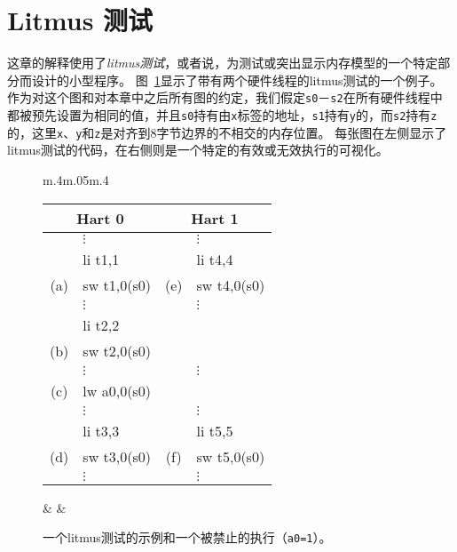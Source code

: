 \section{Litmus 测试}\label{sec:litmustests}
这章的解释使用了{\em litmus测试}，或者说，为测试或突出显示内存模型的一个特定部分而设计的小型程序。
图~\ref{fig:litmus:sample}显示了带有两个硬件线程的litmus测试的一个例子。
作为对这个图和对本章中之后所有图的约定，我们假定{\tt s0}－{\tt s2}在所有硬件线程中都被预先设置为相同的值，并且{\tt s0}持有由{\tt x}标签的地址，{\tt s1}持有{\tt y}的，而{\tt s2}持有{\tt z}的，这里{\tt x}、{\tt y}和{\tt z}是对齐到8字节边界的不相交的内存位置。
每张图在左侧显示了litmus测试的代码，在右侧则是一个特定的有效或无效执行的可视化。

\begin{figure}[h!]
  \centering
    \begin{tabular}{m{.4\linewidth}m{.05\linewidth}m{.4\linewidth}}
    \tt\small
    \begin{tabular}{cl||cl}
    \multicolumn{2}{c}{Hart 0} & \multicolumn{2}{c}{Hart 1} \\
    \hline
          & $\vdots$    &     & $\vdots$    \\
          & li t1,1     &     & li t4,4     \\
      (a) & sw t1,0(s0) & (e) & sw t4,0(s0) \\
          & $\vdots$    &     & $\vdots$    \\
          & li t2,2     &     &             \\
      (b) & sw t2,0(s0) &     &             \\
          & $\vdots$    &     & $\vdots$    \\
      (c) & lw a0,0(s0) &     &             \\
          & $\vdots$    &     & $\vdots$    \\
          & li t3,3     &     & li t5,5     \\
      (d) & sw t3,0(s0) & (f) & sw t5,0(s0) \\
          & $\vdots$    &     & $\vdots$    \\
    \end{tabular}
    & &
    
\end{tabular}
    \caption{一个litmus测试的示例和一个被禁止的执行（{\tt a0=1}）。}
  \label{fig:litmus:sample}
\end{figure}

